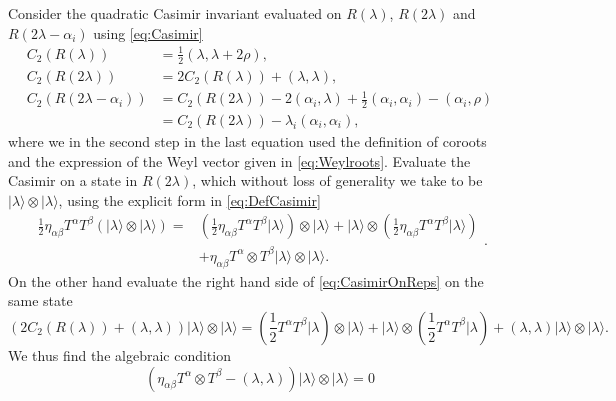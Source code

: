 Consider the quadratic Casimir invariant evaluated on $R(\lambda)$, $R(2\lambda)$ and $R(2\lambda-\alpha_i)$ using \eqref{eq:Casimir}
\begin{equation}\label{eq:CasimirOnReps}
    \begin{aligned}
        C_2(R(\lambda)) &= \frac{1}{2}(\lambda,\lambda+2\rho),\\
        C_2(R(2\lambda)) &= 2C_2(R(\lambda))+(\lambda,\lambda),\\
        C_2(R(2\lambda-\alpha_i)) &= C_2(R(2\lambda))-2(\alpha_i,\lambda)+\frac{1}{2}(\alpha_i,\alpha_i)-(\alpha_i,\rho)\\
        &= C_2(R(2\lambda))-\lambda_i(\alpha_i,\alpha_i),
    \end{aligned}
\end{equation}
where we in the second step in the last equation used the definition of coroots and the expression of the Weyl vector given in \eqref{eq:Weylroots}. Evaluate the Casimir on a state in $R(2\lambda)$, which without loss of generality we take to be $|\lambda\rangle\otimes|\lambda\rangle$, using the explicit form in \eqref{eq:DefCasimir}
\begin{equation}
    \begin{aligned}
    \frac{1}{2}\eta_{\alpha\beta}T^\alpha T^\beta\left(|\lambda\rangle\otimes|\lambda\rangle\right) =& \left(\frac{1}{2}\eta_{\alpha\beta}T^\alpha T^\beta |\lambda\rangle\right)\otimes|\lambda\rangle +|\lambda\rangle\otimes\left(\frac{1}{2}\eta_{\alpha\beta}T^\alpha T^\beta |\lambda\rangle\right)\\
    &+ \eta_{\alpha\beta}T^\alpha\otimes T^\beta|\lambda\rangle\otimes|\lambda\rangle. 
    \end{aligned}.
\end{equation}
On the other hand evaluate the right hand side of \eqref{eq:CasimirOnReps} on the same state
\begin{equation}
    \left(2C_2(R(\lambda))+(\lambda,\lambda)\right)|\lambda\rangle\otimes|\lambda\rangle = \left(\frac{1}{2}T^\alpha T^\beta|\lambda\right)\otimes|\lambda\rangle+|\lambda\rangle\otimes\left(\frac{1}{2}T^\alpha T^\beta|\lambda\right)+(\lambda,\lambda)|\lambda\rangle\otimes|\lambda\rangle. 
\end{equation}
We thus find the algebraic condition 
\begin{equation}
    \left(\eta_{\alpha\beta}T^\alpha\otimes T^\beta-(\lambda,\lambda)\right) |\lambda\rangle\otimes|\lambda\rangle=0
\end{equation}
